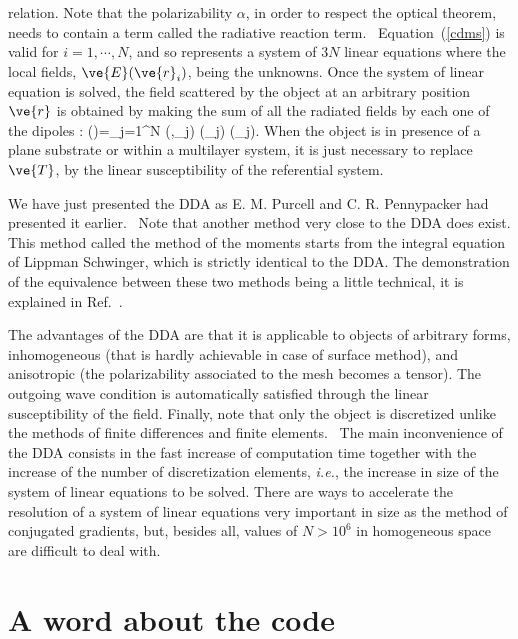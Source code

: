 relation. Note that the polarizability $\alpha$, in order to respect
the optical theorem, needs to contain a term called the radiative
reaction term.~\cite{Draine_AJ_88} Equation~(\ref{cdms}) is valid for
$i=1,\cdots,N$, and so represents a system of $3N$ linear equations
where the local fields, $\ve{E}(\ve{r}_i)$, being the unknowns. Once
the system of linear equation is solved, the field scattered by the
object at an arbitrary position $\ve{r}$ is obtained by making the sum
of all the radiated fields by each one of the dipoles :
\be \label{cdmd} ()=\sum_{j=1}^{N} (,_j)
\alpha(_j) (_j). \ee
When the object is in presence of a plane substrate or within a
multilayer system, it is just necessary to replace $\ve{T}$, by the
linear susceptibility of the referential system.

We have just presented the DDA as E. M. Purcell and C. R. Pennypacker
had presented it earlier.~\cite{Purcell_AJ_73} Note that another
method very close to the DDA does exist. This method called the method
of the moments starts from the integral equation of Lippman Schwinger,
which is strictly identical to the DDA. The demonstration of the
equivalence between these two methods being a little technical, it is
explained in Ref.~\cite{Chaumet_PRE_04}.

The advantages of the DDA are that it is applicable to objects of
arbitrary forms, inhomogeneous (that is hardly achievable in case of
surface method), and anisotropic (the polarizability associated to the
mesh becomes a tensor). The outgoing wave condition is automatically
satisfied through the linear susceptibility of the field. Finally,
note that only the object is discretized unlike the methods of finite
differences and finite elements.~\cite{Kahnert_JQSRT_03} The main
inconvenience of the DDA consists in the fast increase of computation
time together with the increase of the number of discretization
elements, {\it i.e.}, the increase in size of the system of linear
equations to be solved.  There are ways to accelerate the resolution
of a system of linear equations very important in size as the method
of conjugated gradients, but, besides all, values of $N>10^6$ in
homogeneous space are difficult to deal with.

\section{A word about the code}

